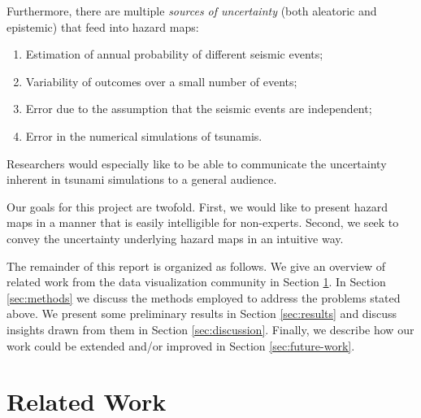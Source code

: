 \documentclass{vgtc}                          %
\begin{document}
Furthermore, there are multiple {\it sources of uncertainty} (both aleatoric and epistemic) that feed into hazard maps:
\begin{enumerate}
    \item Estimation of annual probability of different seismic events;
    \item Variability of outcomes over a small number of events;
    \item Error due to the assumption that the seismic events are independent;
    \item Error in the numerical simulations of tsunamis.
\end{enumerate}
Researchers would especially like to be able to communicate the uncertainty inherent in tsunami simulations to a general audience.

Our goals for this project are twofold. First, we would like to present hazard maps in a manner that is easily intelligible for non-experts. Second, we seek to convey the uncertainty underlying hazard maps in an intuitive way.



The remainder of this report is organized as follows. We give an overview of related work from the data visualization community in Section \ref{sec:related-work}. In Section \ref{sec:methods} we discuss the methods employed to address the problems stated above. We present some preliminary results in Section \ref{sec:results} and discuss insights drawn from them in Section \ref{sec:discussion}. Finally, we describe how our work could be extended and/or improved in Section \ref{sec:future-work}.

\section{Related Work}\label{sec:related-work}
\end{document}
